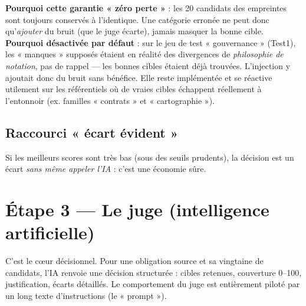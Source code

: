 \documentclass[11pt,a4paper]{report}
\begin{document}
\begin{motiv}
\textbf{Pourquoi cette garantie « zéro perte »} : les 20 candidats des empreintes sont toujours conservés à l'identique. Une catégorie erronée ne peut donc qu'\emph{ajouter} du bruit (que le juge écarte), jamais masquer la bonne cible.\\[3pt]
\textbf{Pourquoi désactivée par défaut} : sur le jeu de test « gouvernance » (Test1), les « manques » supposés étaient en réalité des divergences de \emph{philosophie de notation}, pas de rappel — les bonnes cibles étaient déjà trouvées. L'injection y ajoutait donc du bruit sans bénéfice. Elle reste implémentée et se réactive utilement sur les référentiels où de vraies cibles échappent réellement à l'entonnoir (ex. familles « contrats » et « cartographie »).
\end{motiv}

\section{Raccourci « écart évident »}
Si les meilleurs scores sont très bas (sous des seuils prudents), la décision est un écart \emph{sans même appeler l'IA} : c'est une économie sûre.

\chapter{Étape 3 --- Le juge (intelligence artificielle)}

C'est le cœur décisionnel. Pour une obligation source et sa vingtaine de candidats, l'IA renvoie une décision structurée : cibles retenues, couverture 0--100, justification, écarts détaillés. Le comportement du juge est entièrement piloté par un long texte d'instructions (le « prompt »).
\end{document}
